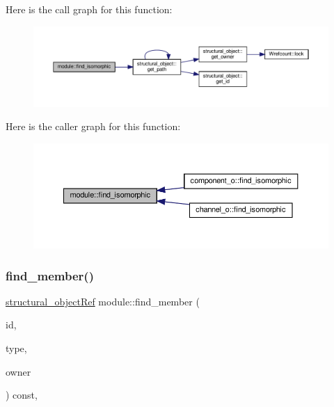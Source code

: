 Here is the call graph for this function\+:
\nopagebreak
\begin{figure}[H]
\begin{center}
\leavevmode
\includegraphics[width=350pt]{d0/dd3/classmodule_a9d8b3c8198d31d1440cb3df2fed8f346_cgraph}
\end{center}
\end{figure}
Here is the caller graph for this function\+:
\nopagebreak
\begin{figure}[H]
\begin{center}
\leavevmode
\includegraphics[width=350pt]{d0/dd3/classmodule_a9d8b3c8198d31d1440cb3df2fed8f346_icgraph}
\end{center}
\end{figure}
\mbox{\label{classmodule_aa9d6bab510486b47eef4c0cd37bc6126}} 
\subsubsection{\texorpdfstring{find\+\_\+member()}{find\_member()}}
{\footnotesize\ttfamily \hyperlink{structural__objects_8hpp_a8ea5f8cc50ab8f4c31e2751074ff60b2}{structural\+\_\+object\+Ref} module\+::find\+\_\+member (\begin{DoxyParamCaption}\item[{const std\+::string \&}]{id,  }\item[{\hyperlink{structural__objects_8hpp_acf52399aecacb7952e414c5746ce6439}{so\+\_\+kind}}]{type,  }\item[{const \hyperlink{structural__objects_8hpp_a8ea5f8cc50ab8f4c31e2751074ff60b2}{structural\+\_\+object\+Ref}}]{owner }\end{DoxyParamCaption}) const\hspace{0.3cm}{\ttfamily [override]}, {\ttfamily [virtual]}}




